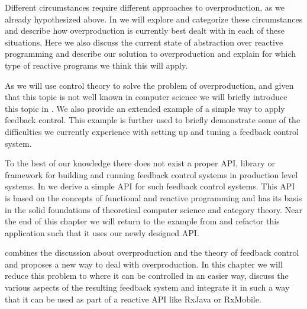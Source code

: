 Different circumstances require different approaches to overproduction, as we already hypothesized above. In  we will explore and categorize these circumstances and describe how overproduction is currently best dealt with in each of these situations. Here we also discuss the current state of abstraction over reactive programming and describe our solution to overproduction and explain for which type of reactive programs we think this will apply.

As we will use control theory to solve the problem of overproduction, and given that this topic is not well known in computer science we will briefly introduce this topic in . We also provide an extended example of a simple way to apply feedback control. This example is further used to briefly demonstrate some of the difficulties we currently experience with setting up and tuning a feedback control system.

To the best of our knowledge there does not exist a proper API, library or framework for building and running feedback control systems in production level systems. In  we derive a simple API for such feedback control systems. This API is based on the concepts of functional and reactive programming and has its basis in the solid foundations of theoretical computer science and category theory. Near the end of this chapter we will return to the example from  and refactor this application such that it uses our newly designed API.

 combines the discussion about overproduction and the theory of feedback control and proposes a new way to deal with overproduction. In this chapter we will reduce this problem to where it can be controlled in an easier way, discuss the various aspects of the resulting feedback system and integrate it in such a way that it can be used as part of a reactive API like RxJava or RxMobile.
